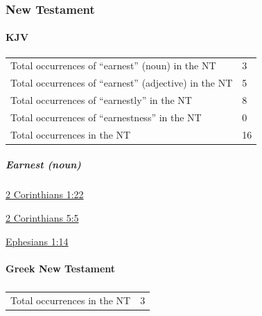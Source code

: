 		
		
	\subsubsection{New Testament} %
		\label{EARNEST-NT}
	
		\paragraph{KJV}
			\label{EARNEST-NT-KJV}		
	
			\begin{tabular}{ll}
				Total occurrences of ``earnest'' (noun) in the NT & 3 \\
				Total occurrences of ``earnest'' (adjective) in the NT & 5 \\
				Total occurrences of ``earnestly'' in the NT & 8 \\
				Total occurrences of ``earnestness'' in the NT & 0 \\
				Total occurrences in the NT & 16 \\
			\end{tabular}
			
			\subparagraph{Earnest (noun)}
			
				\begin{compactdesc}
					\item[{\hyperref[2CORINTHIANS-1-22]{2 Corinthians 1:22}}]
					\item[{\hyperref[2CORINTHIANS-5-5]{2 Corinthians 5:5}}]
					\item[{\hyperref[EPHESIANS-1-14]{Ephesians 1:14}}]
				\end{compactdesc}
			
		\paragraph{Greek New Testament} %
			\label{EARNEST-GREEK}
		
			\subparagraph{\texorpdfstring{}{}}
				\label{ARRABON}
				
				\begin{tabular}{ll}
					Total occurrences in the NT & 3
				\end{tabular}
				
